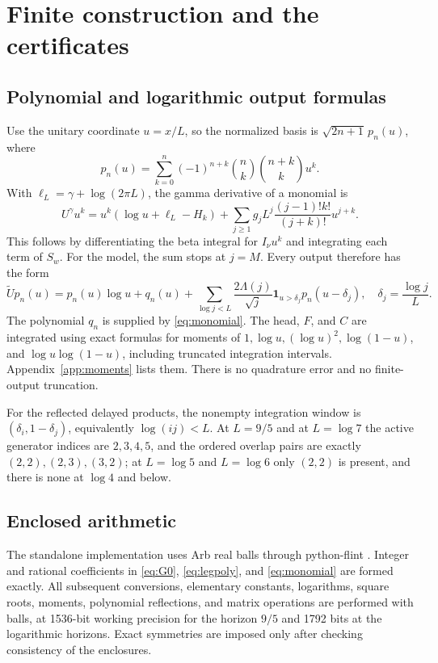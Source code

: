 \documentclass[11pt]{article}
\numberwithin{equation}{section}
\theoremstyle{definition}
\theoremstyle{remark}
\begin{document}
\section{Finite construction and the certificates}\label{sec:computation}

\subsection{Polynomial and logarithmic output formulas}

Use the unitary coordinate $u=x/L$, so the normalized basis is
$\sqrt{2n+1}\,p_n(u)$, where
\begin{equation}\label{eq:legpoly}
 p_n(u)=\sum_{k=0}^n(-1)^{n+k}\binom nk\binom{n+k}k u^k.
\end{equation}
With $\ell_L=\gamma+\log(2\pi L)$, the gamma derivative of a monomial is
\begin{equation}\label{eq:monomial}
 U^\gamma u^k=u^k(\log u+\ell_L-H_k)
 +\sum_{j\ge1}g_jL^j\frac{(j-1)!k!}{(j+k)!}u^{j+k}.
\end{equation}
This follows by differentiating the beta integral for $I_\nu u^k$ and
integrating each term of $S_w$. For the model, the sum stops at $j=M$.
Every output therefore has the form
\begin{equation}\label{eq:output}
 \widetilde Up_n(u)=p_n(u)\log u+q_n(u)
 +\sum_{\log j<L}\frac{2\Lambda(j)}{\sqrt j}
   \mathbf1_{u>\delta_j}p_n(u-\delta_j),
 \quad \delta_j=\frac{\log j}{L}.
\end{equation}
The polynomial $q_n$ is supplied by \eqref{eq:monomial}.
The head, $F$, and $C$ are integrated using exact formulas for moments of
$1,\log u,(\log u)^2,\log(1-u)$, and $\log u\log(1-u)$, including
truncated integration intervals. Appendix~\ref{app:moments} lists them.
There is no quadrature error and no finite-output truncation.

For the reflected delayed products, the nonempty integration window is
$(\delta_i,1-\delta_j)$, equivalently $\log(ij)<L$.
At $L=9/5$ and at $L=\log7$ the active generator indices are $2,3,4,5$, and
the ordered overlap pairs are exactly $(2,2),(2,3),(3,2)$; at $L=\log5$ and
$L=\log6$ only $(2,2)$ is present, and there is none at $\log4$ and below.

\subsection{Enclosed arithmetic}

The standalone implementation uses Arb real balls \cite{Johansson2017}
through python-flint \cite{PythonFlint}. Integer and rational coefficients
in \eqref{eq:G0}, \eqref{eq:legpoly}, and \eqref{eq:monomial} are formed
exactly. All subsequent conversions, elementary constants, logarithms,
square roots, moments, polynomial reflections, and matrix operations are
performed with balls, at 1536-bit working precision for the horizon $9/5$
and 1792 bits at the logarithmic horizons. Exact symmetries are imposed only
after checking consistency of the enclosures.
\end{document}
